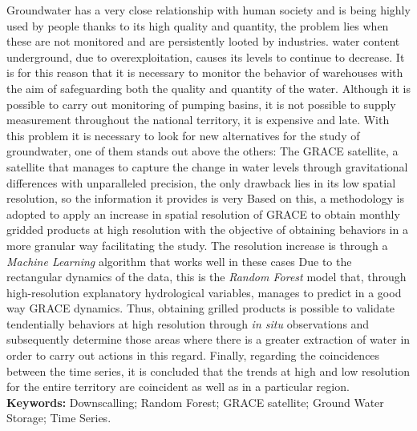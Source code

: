 Groundwater has a very close relationship with human society and is being highly used by people thanks to its
high quality and quantity, the problem lies when these are not monitored and are persistently looted by industries. water content
underground, due to overexploitation, causes its levels to continue to decrease. It is for this reason that it is necessary to monitor the behavior of
warehouses with the aim of safeguarding both the quality and quantity of the water. Although it is possible to carry out monitoring of pumping basins, it is not
possible to supply measurement throughout the national territory, it is expensive and late. With this problem it is necessary to look for new alternatives for the study of
groundwater, one of them stands out above the others: The GRACE satellite, a satellite that manages to capture the change in water levels through gravitational differences with unparalleled precision,
the only drawback lies in its low spatial resolution, so the information it provides is very
Based on this, a methodology is adopted to apply an increase in spatial resolution of GRACE to obtain monthly gridded products at high resolution with the
objective of obtaining behaviors in a more granular way facilitating the study. The resolution increase is through a \textit{Machine Learning} algorithm that works well in these cases
Due to the rectangular dynamics of the data, this is the \textit{Random Forest} model that, through high-resolution explanatory hydrological variables, manages to predict in a good way
GRACE dynamics. Thus, obtaining grilled products is possible to validate tendentially
behaviors at high resolution through \textit{in situ} observations and subsequently determine those areas where there is a greater extraction of water in order to carry out actions in this regard.
Finally, regarding the coincidences between the time series, it is concluded that the trends at high and low resolution for the entire territory are coincident as well as in a particular region.
\vskip 0.2in
\noindent
{\bf Keywords:} Downscalling; Random Forest; GRACE satellite; Ground Water Storage; Time Series.
